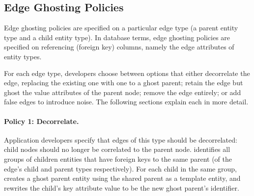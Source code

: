 
%

\subsection{Edge Ghosting Policies}
Edge ghosting policies are specified on a particular edge type (a parent entity type and a child
entity type). In database terms, edge ghosting policies are specified on referencing
(foreign key) columns, namely the edge attributes of entity types.

For each edge type, developers choose between options that either decorrelate the edge, replacing
the existing one with one to a ghost parent; retain the edge but ghost the value attributes of the
parent node; remove the edge entirely; or add false edges to introduce noise.  The following
sections explain each in more detail.

\paragraph{Policy 1: Decorrelate.}
Application developers specify that edges of this type should be decorrelated: child nodes should no
longer be correlated to the parent node. \sys identifies all groups of children entities that have
foreign keys to the same parent (of the edge's child and parent types respectively). For each child
in the same group, \sys creates a ghost parent entity using the shared parent as a template entity,
and rewrites the child's key attribute value to be the new ghost parent's identifier. 

